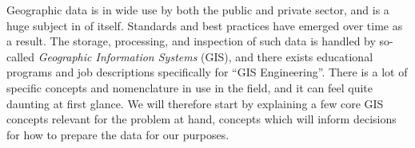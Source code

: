 Geographic data is in wide use by both the public and private sector, and is a huge subject in of itself.
Standards and best practices have emerged over time as a result.
The storage, processing, and inspection of such data is handled by so-called \textit{Geographic Information Systems} (GIS), and there exists educational programs and job descriptions specifically for \enquote{GIS Engineering}.
There is a lot of specific concepts and nomenclature in use in the field, and it can feel quite daunting at first glance.
We will therefore start by explaining a few core GIS concepts relevant for the problem at hand, concepts which will inform decisions for how to prepare the data for our purposes.
